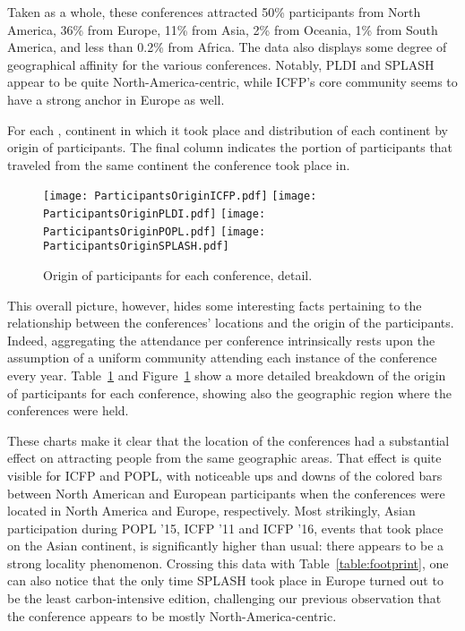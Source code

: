 Taken as a whole, these conferences attracted 50\% participants from North
America, 36\% from Europe, 11\% from Asia, 2\% from Oceania, 1\% from South
America, and less than 0.2\% from Africa.
The data also displays some degree of geographical affinity for the 
various conferences.
Notably, PLDI and SPLASH appear to be quite North-America-centric, while
ICFP's core community seems to have a strong anchor in Europe as well.

\begin{table}
  \caption{For each \event, continent in which it took place and distribution of
    each continent by origin of participants. The final column indicates the
    portion of participants that traveled from the same continent the
    conference took place in.}
  \label{table:demo-per-event}
\end{table}

\begin{figure}
  \centering
  \texttt{[image: ParticipantsOriginICFP.pdf]}
  \texttt{[image: ParticipantsOriginPLDI.pdf]}
  \texttt{[image: ParticipantsOriginPOPL.pdf]}
  \texttt{[image: ParticipantsOriginSPLASH.pdf]}
  \caption{Origin of participants for each conference, detail.}
  \label{fig:demo-per-event}
\end{figure}

This overall picture, however, hides some interesting facts pertaining to the
relationship between the conferences' locations and the origin of the participants.
Indeed, aggregating the attendance per conference intrinsically rests upon the
assumption of a uniform community attending each instance of the conference
every year. Table~\ref{fig:demo-per-event} and Figure~\ref{fig:demo-per-event}
show a more detailed breakdown of the origin of participants for each
conference, showing also the geographic region where the conferences were held.

These charts make it clear that the location of the conferences had a
substantial effect on attracting people from the same geographic areas. That
effect is quite visible for ICFP and POPL, with noticeable ups and downs of
the colored bars between North American and European participants when the
conferences were located in North America and Europe, respectively. Most
strikingly, Asian participation during POPL '15, ICFP '11 and ICFP '16,
events that took place on the Asian continent, is significantly higher than
usual: there appears to be a strong locality phenomenon. Crossing this data
with Table~\ref{table:footprint}, one can also notice that the only time
SPLASH took place in Europe turned out to be the least carbon-intensive
edition, challenging our previous observation that the conference appears to
be mostly North-America-centric.

